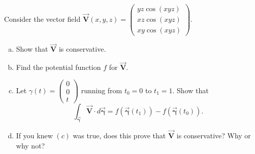\documentclass[12pt]{article} %
\newcommand{\vecfieldV}{\boldsymbol{\vec{V}}}
\newcommand{\curvegamma}{\boldsymbol{\vec{\gamma}}}
\begin{document}
\begin{problem}
    Consider the vector field $\vecfieldV(x,y,z) = \begin{pmatrix} yz \cos(xyz) \\ xz \cos(xyz) \\ xy \cos(xyz) \end{pmatrix}$. 
\begin{enumerate}[(a)]
    \item Show that $\vecfieldV$ is conservative.
    \item Find the potential function $f$ for $\vecfieldV$.
    \item Let $\gamma(t) = \begin{pmatrix} 0 \\ 0 \\ t \end{pmatrix}$ running from $t_0=0$ to $t_1=1$. Show that
    \[
    \int_{\curvegamma} \vecfieldV \cdot d \curvegamma = f(\curvegamma(t_1))-f(\curvegamma(t_0)).
    \]
    \item If you knew $(c)$ was true, does this prove that $\vecfieldV$ is conservative? Why or why not?
\end{enumerate}
\end{problem}
\end{document}
